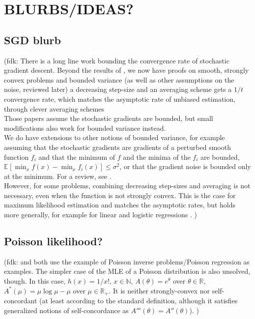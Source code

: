 \documentclass[twoside]{article}
\let\oldsection\section
\renewcommand{\section}[1]{\oldsection{\texorpdfstring{\uppercase{#1}}{#1}}}
\newcommand{\fdk}[1]{\textcolor{Periwinkle}{(fdk:#1)}}
\newcommand*{\expect}[2][]{\ensuremath{\mathbb{E}_{#1} \left[ #2 \right] }} %
\newcommand{\m}{\mu}
\begin{document}
\section{Blurbs/ideas?}



\subsection{SGD blurb}
\fdk{
%
There is a long line work bounding the convergence rate of stochastic gradient descent.
Beyond the results of \citet{robbins1951stochastic},
we now have proofs on smooth, strongly convex problems and bounded variance
(as well as other assumptions on the noise, reviewed later)
a decreasing step-size and an averaging scheme gets
a $1/t$ convergence rate,
which matches the asymptotic rate of unbiased estimation,
through clever averaging schemes \citep{rakhlin2012making,lacostejulien2012simpler}
\\
Those papers assume the stochastic gradients are bounded,
but small modifications also work for bounded variance instead.
\\
We do have extensions to other notions of bounded variance,
for example assuming that the stochastic gradients are gradients of a perturbed smooth function $f_i$
and that the minimum of $f$ and the minima of the $f_i$
are bounded, $\expect{\min_x f(x) - \min_x f_i(x)} \leq \sigma^2$,
or that the gradient noise is bounded only at the minimum.
For a review, see \citet{gower2019sgd}.
\\
However, for some problems, combining decreasing step-sizes and averaging is not necessary,
even when the function is not strongly convex.
This is the case for maximum likelihood estimation and matches the asymptotic rates,
but holds more generally, for example for linear and logistic regressions \citep{bach2013nonstronglyconvex,moulines2011non}.
}


\subsection{Poisson likelihood?}
\fdk{
\citet{bauschke2017descent} and \citet{hanzely2018fastest} both use the example of Poisson inverse problems/Poisson regression
as examples.
The simpler case of the MLE of a Poisson distribution is also unsolved, though.
In this case, $h(x) = 1/x!$, $x \in \mathbb{N}$, $A(\theta) = e^\theta$ over $\theta \in \mathbb{R}$,
$A^*(\m) = \m \log \m - \m$ over $\m \in \mathbb{R}_+$.
It is neither strongly-convex nor self-concordant (at least according to the standard definition,
although it satisfies generalized notions of self-concordance as $A'''(\theta) = A''(\theta)$).
}
\end{document}
